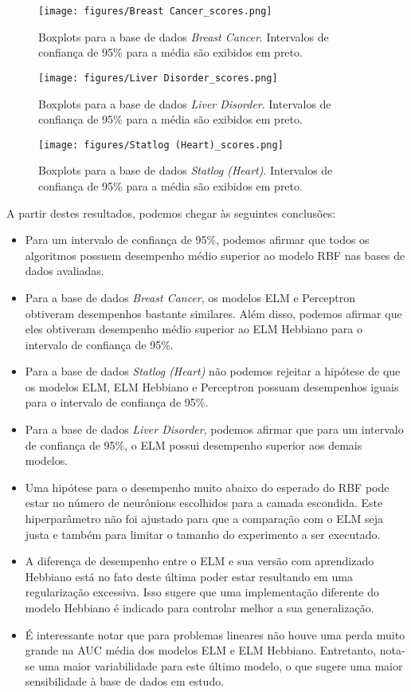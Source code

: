 \documentclass[conference]{IEEEtran}
\begin{document}
	\begin{figure}[thpbh]
		\centering
		\texttt{[image: figures/Breast Cancer\_scores.png]}
		\caption{Boxplots para a base de dados \textit{Breast Cancer}. Intervalos de confiança de 95\% para a média são exibidos em preto.}
		\label{fig:box-Breast Cancer}
	\end{figure}
	
		\begin{figure}[thpbh]
		\centering
		\texttt{[image: figures/Liver Disorder\_scores.png]}
		\caption{Boxplots para a base de dados \textit{Liver Disorder}. Intervalos de confiança de 95\% para a média são exibidos em preto.}
		\label{fig:box-Liver-Disorder}
	\end{figure}	
	
	
	\begin{figure}[thpbh]
		\centering
		\texttt{[image: figures/Statlog (Heart)\_scores.png]}
		\caption{Boxplots para a base de dados \textit{Statlog (Heart)}. Intervalos de confiança de 95\% para a média são exibidos em preto.}
		\label{fig:box-statlog-heart}
	\end{figure}
	
	A partir destes resultados, podemos chegar às seguintes conclusões:
	\begin{itemize}
		\item Para um intervalo de confiança de 95\%, podemos afirmar que todos os algoritmos possuem desempenho médio superior ao modelo RBF nas bases de dados avaliadas.
		\item Para a base de dados \textit{Breast Cancer}, os modelos ELM e Perceptron obtiveram desempenhos bastante similares. Além disso, podemos afirmar que eles obtiveram desempenho médio superior ao ELM Hebbiano para o intervalo de confiança de 95\%.
		\item Para a base de dados \textit{Statlog (Heart)} não podemos rejeitar a hipótese de que os modelos ELM, ELM Hebbiano e Perceptron possuam desempenhos iguais para o intervalo de confiança de 95\%.
		\item Para a base de dados \textit{Liver Disorder}, podemos afirmar que para um intervalo de confiança de 95\%, o ELM possui desempenho superior aos demais modelos.
		\item Uma hipótese para o desempenho muito abaixo do esperado do RBF pode estar no número de neurônions escolhidos para a camada escondida. Este hiperparâmetro não foi ajustado para que a comparação com o ELM seja justa e também para limitar o tamanho do experimento a ser executado. 
		\item A diferença de desempenho entre o ELM e sua versão com aprendizado Hebbiano está no fato deste última poder estar resultando em uma regularização excessiva. Isso sugere que uma implementação diferente do modelo Hebbiano é indicado para controlar melhor a sua generalização.
		\item É interessante notar que para problemas lineares não houve uma perda muito grande na AUC média dos modelos ELM e ELM Hebbiano. Entretanto, nota-se uma maior variabilidade para este último modelo, o que sugere uma maior sensibilidade à base de dados em estudo. 
	\end{itemize}
\end{document}
